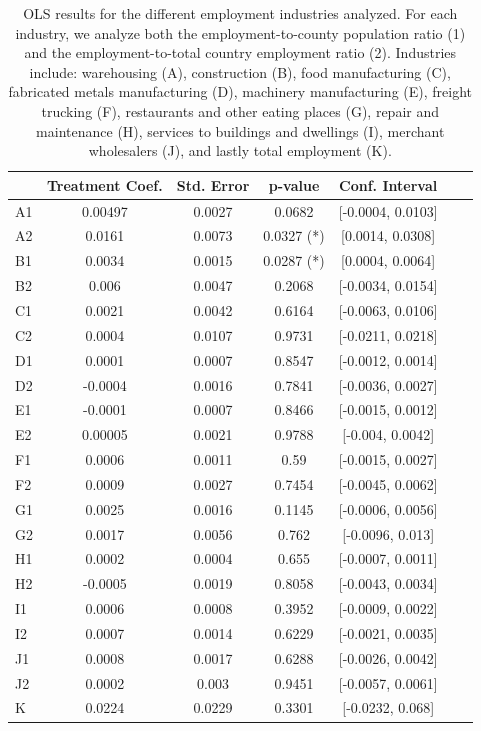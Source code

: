 \documentclass[11pt]{article}
\begin{document}
\begin{table}[H]
\centering
\begin{tabular}[H]{lcccccc}
\toprule
&Treatment Coef.&Std. Error&p-value&Conf. Interval\\
\midrule

A1&0.00497 &0.0027&0.0682&[-0.0004, 0.0103]\\
A2&0.0161 &0.0073&0.0327 (*) &[0.0014, 0.0308]\\
B1&0.0034 &0.0015&0.0287 (*)&[0.0004, 0.0064]\\
B2&0.006&0.0047&0.2068&[-0.0034, 0.0154]\\
C1&0.0021 &0.0042&0.6164&[-0.0063, 0.0106]\\
C2&0.0004 &0.0107&0.9731&[-0.0211, 0.0218]\\
D1&0.0001 &0.0007&0.8547&[-0.0012, 0.0014]\\
D2&-0.0004 &0.0016&0.7841&[-0.0036, 0.0027]\\
E1&-0.0001 &0.0007&0.8466&[-0.0015, 0.0012]\\
E2&0.00005 &0.0021&0.9788&[-0.004, 0.0042]\\
F1&0.0006 &0.0011&0.59&[-0.0015, 0.0027]\\
F2&0.0009 &0.0027&0.7454&[-0.0045, 0.0062]\\
G1&0.0025 &0.0016&0.1145&[-0.0006, 0.0056]\\
G2&0.0017 &0.0056&0.762&[-0.0096, 0.013]\\
H1&0.0002 &0.0004&0.655&[-0.0007, 0.0011]\\
H2&-0.0005 &0.0019&0.8058&[-0.0043, 0.0034]\\
I1& 0.0006 &0.0008&0.3952&[-0.0009, 0.0022]\\
I2&0.0007 &0.0014&0.6229&[-0.0021, 0.0035]\\
J1&0.0008 &0.0017&0.6288&[-0.0026, 0.0042]\\
J2&0.0002 &0.003&0.9451&[-0.0057, 0.0061]\\
K&0.0224& 0.0229& 0.3301& [-0.0232, 0.068]\\
\bottomrule
\end{tabular}
\caption{OLS results for the different employment industries analyzed. For each industry, we analyze both the employment-to-county population ratio (1) and the employment-to-total country employment ratio (2). Industries include: warehousing (A), construction (B), food manufacturing (C), fabricated metals manufacturing (D), machinery manufacturing (E), freight trucking (F), restaurants and other eating places (G), repair and maintenance (H), services to buildings and dwellings (I), merchant wholesalers (J), and lastly total employment (K).}
\end{table}%
\end{document}
